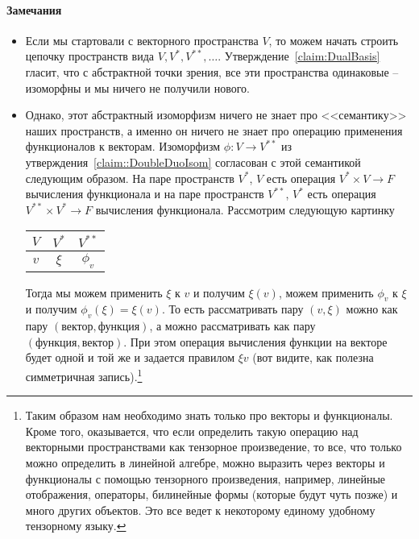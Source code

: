 \paragraph{Замечания}
\begin{itemize}
\item Если мы стартовали с векторного пространства $V$, то можем начать строить цепочку пространств вида $V, V^*, V^{**}, \ldots$. Утверждение~\ref{claim:DualBasis} гласит, что с абстрактной точки зрения, все эти пространства одинаковые -- изоморфны и мы ничего не получили нового.

\item Однако, этот абстрактный изоморфизм ничего не знает про <<семантику>> наших пространств, а именно он ничего не знает про операцию применения функционалов к векторам. Изоморфизм $\phi\colon V\to V^{**}$ из утверждения~\ref{claim::DoubleDuoIsom} согласован с этой семантикой следующим образом. На паре пространств $V^*$, $V$ есть операция $V^*\times V\to F$ вычисления функционала и на паре пространств $V^{**}$, $V^*$ есть операция $V^{**}\times V^*\to F$ вычисления функционала. Рассмотрим следующую картинку
\begin{center}
\begin{tabular}{c|c|c}

{$V$}&{$V^*$}&{$V^{**}$}\\

\hline

{$v$}&{$\xi$}&{$\phi_v$}\\

\end{tabular}
\end{center}
Тогда мы можем применить $\xi$ к $v$ и получим $\xi(v)$, можем применить $\phi_v$ к $\xi$ и получим $\phi_v(\xi) = \xi(v)$. То есть рассматривать пару $(v,\xi)$ можно как пару $(\text{вектор}, \text{функция})$, а можно рассматривать как пару $(\text{функция}, \text{вектор})$. При этом операция вычисления функции на векторе будет одной и той же и задается правилом $\xi v$ (вот видите, как полезна симметричная запись).\footnote{Таким образом нам необходимо знать только про векторы и функционалы. Кроме того, оказывается, что если определить такую операцию над векторными пространствами как тензорное произведение, то все, что только можно определить в линейной алгебре, можно выразить через векторы и функционалы с помощью тензорного произведения, например, линейные отображения, операторы, билинейные формы (которые будут чуть позже) и много других объектов. Это все ведет к некоторому единому удобному тензорному языку.}



\end{itemize}

